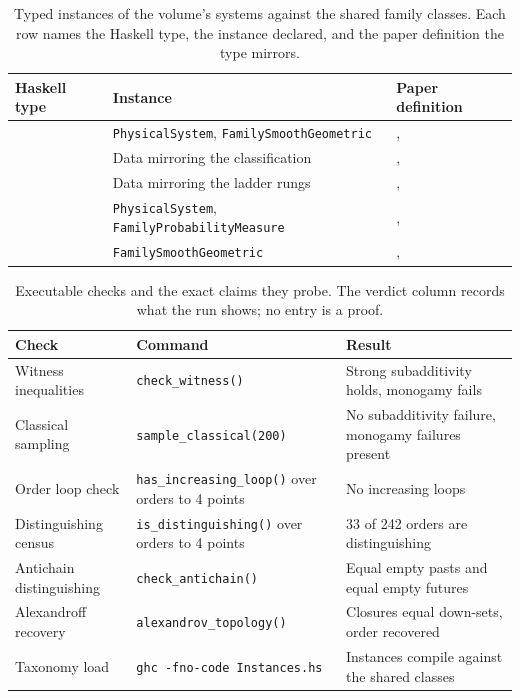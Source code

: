 \documentclass[11pt,letterpaper]{article}
\theoremstyle{definition}
\theoremstyle{remark}
\begin{document}
\begin{table}[t]
\centering
\caption{Typed instances of the volume's systems against the shared family classes. Each row names the Haskell type, the instance declared, and the paper definition the type mirrors.}
\label{tab:haskell}
\footnotesize
\begin{tabularx}{\textwidth}{L{0.25\textwidth}L{0.32\textwidth}X}
\toprule
Haskell type & Instance & Paper definition \\
\midrule
{} & \texttt{PhysicalSystem}, \texttt{FamilySmoothGeometric} & ,  \\
 & Data mirroring the classification & ,  \\
 & Data mirroring the ladder rungs & ,  \\
 & \texttt{PhysicalSystem}, \texttt{FamilyProbabilityMeasure} & ,  \\
 & \texttt{FamilySmoothGeometric} & ,  \\
\bottomrule
\end{tabularx}
\end{table}

\begin{table}[t]
\centering
\caption{Executable checks and the exact claims they probe. The verdict column records what the run shows; no entry is a proof.}
\label{tab:checks}
\footnotesize
\begin{tabularx}{\textwidth}{L{0.30\textwidth}L{0.32\textwidth}X}
\toprule
Check & Command & Result \\
\midrule
Witness inequalities & \texttt{check\_witness()} & Strong subadditivity holds, monogamy fails \\
Classical sampling & \texttt{sample\_classical(200)} & No subadditivity failure, monogamy failures present \\
Order loop check & \texttt{has\_increasing\_loop()} over orders to 4 points & No increasing loops \\
Distinguishing census & \texttt{is\_distinguishing()} over orders to 4 points & 33 of 242 orders are distinguishing \\
Antichain distinguishing & \texttt{check\_antichain()} & Equal empty pasts and equal empty futures \\
Alexandroff recovery & \texttt{alexandrov\_topology()} & Closures equal down-sets, order recovered \\
Taxonomy load & \texttt{ghc -fno-code Instances.hs} & Instances compile against the shared classes \\
\bottomrule
\end{tabularx}
\end{table}
\end{document}

